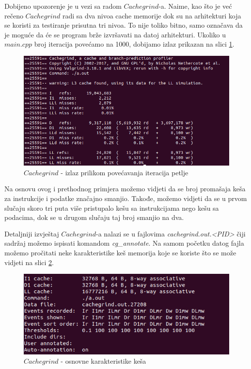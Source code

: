 \documentclass[a4paper]{article}
\begin{document}
Dobijeno upozorenje je u vezi sa radom $Cachegrind$-a. Naime, kao što je već rečeno $Cachegrind$ radi sa dva nivoa cache memorije dok su na arhitekturi koja se koristi za testiranje prisutna tri nivoa. To nije toliko bitno, samo označava da je moguće da će se program brže izvršavati na datoj arhitekturi.
Ukoliko u $main.cpp$ broj iteracija povećamo na 1000, dobijamo izlaz prikazan na slici \ref{fig:cache2}.
	\begin{figure}[h!]
		\caption{$Cachegrind$ - izlaz prilikom povećavanja iteracija petlje}
		\label{fig:cache2}
		\includegraphics[scale=0.5]{cache2.png}
	\end{figure}

Na osnovu ovog i prethodnog primjera možemo vidjeti da se broj promašaja keša za instrukcije i podatke značajno smanjio. Takođe, možemo vidjeti da se u prvom slučaju skoro tri puta više pristupalo kešu sa instrukcijama nego kešu sa podacima, dok se u drugom slučaju taj broj smanjio na dva. 

Detaljniji izvještaj $Cachegrind$-a nalazi se u fajlovima \textit{cachegrind.out.<PID>} čiji sadržaj možemo ispisati komandom \textit{cg\_annotate}. Na samom početku datog fajla možemo pročitati neke karakteristike keš memorija koje se koriste što se može vidjeti na slici \ref{fig:cache3}.
	\begin{figure}[h!]
		\centering
		\caption{$Cachegrind$ - osnovne karakteristike keša}
		\label{fig:cache3}
		\includegraphics[scale=0.6]{cache3.png}
	\end{figure}
\end{document}

